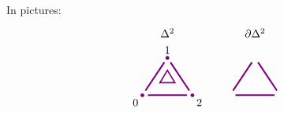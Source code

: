         In pictures:
        \begin{equation*}
            \begin{tikzpicture}[
                scale=0.8,
                thick,
                color=violet, %
                dot/.style={circle, fill=violet, inner sep=1.2pt, outer sep=0pt},
                edge/.style={line width=1.5pt, shorten <=5pt, shorten >=5pt},
            ]

                \begin{scope}[shift={(0,0)}]
                    \coordinate (v0) at (0,0);
                    \coordinate (v1) at (1,1.5);
                    \coordinate (v2) at (2,0);
        
                    \node[text=black, scale=1.0] at (1.0, 2.5) {$\Delta^2$};
        
                    \draw[edge] (v0) -- (v1);
                    \draw[edge] (v1) -- (v2);
                    \draw[edge] (v0) -- (v2);
        
                    \draw[line width=1.2pt] (0.7, 0.5) -- (1, 1.0) -- (1.3, 0.5) -- cycle;

                    \node[dot] at (v0) {}; \node[text=black, below left] at (v0) {0};
                    \node[dot] at (v1) {}; \node[text=black, above]      at (v1) {1};
                    \node[dot] at (v2) {}; \node[text=black, below right] at (v2) {2};
                \end{scope}


                \begin{scope}[shift={(3.5,0)}]
                    \coordinate (v0) at (0,0);
                    \coordinate (v1) at (1,1.5);
                    \coordinate (v2) at (2,0);
        
                    \node[text=black, scale=1.0] at (1, 2.5) {$\partial \Delta^2$};
        
                    \draw[edge] (v0) -- (v1);
                    \draw[edge] (v1) -- (v2);
                    \draw[edge] (v0) -- (v2);
        

\end{scope}
\end{tikzpicture}
\end{equation*}
